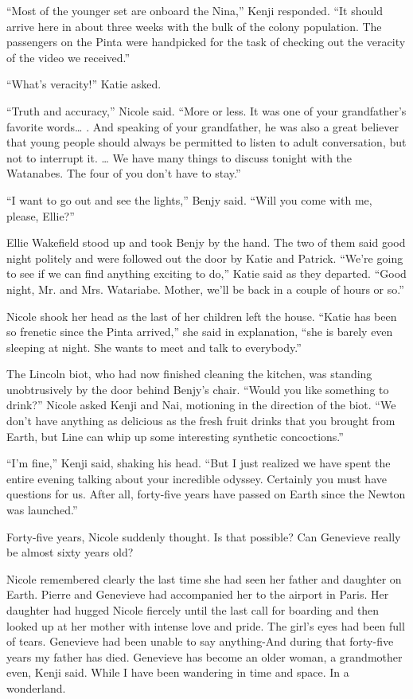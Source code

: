 \documentclass[]{article}
\begin{document}
{“Most of the younger set are onboard the Nina,” Kenji responded.  “It should arrive here in about three weeks with the bulk of the colony population.  The passengers on the Pinta were handpicked for the task of checking out the veracity of the video we received.”

“What’s veracity!” Katie asked.

“Truth and accuracy,” Nicole said.  “More or less.  It was one of your grandfather’s favorite words… .  And speaking of your grandfather, he was also a great believer that young people should always be permitted to listen to adult conversation, but not to interrupt it.  … We have many things to discuss tonight with the Watanabes.  The four of you don’t have to stay.”

“I want to go out and see the lights,” Benjy said.  “Will you come with me, please, Ellie?”

Ellie Wakefield stood up and took Benjy by the hand.  The two of them said good night politely and were followed out the door by Katie and Patrick.  “We’re going to see if we can find anything exciting to do,” Katie said as they departed.  “Good night, Mr.  and Mrs.  Watariabe.  Mother, we’ll be back in a couple of hours or so.”

Nicole shook her head as the last of her children left the house.  “Katie has been so frenetic since the Pinta arrived,” she said in explanation, “she is barely even sleeping at night.  She wants to meet and talk to everybody.”

The Lincoln biot, who had now finished cleaning the kitchen, was standing unobtrusively by the door behind Benjy’s chair.  “Would you like something to drink?” Nicole asked Kenji and Nai, motioning in the direction of the biot.  “We don’t have anything as delicious as the fresh fruit drinks that you brought from Earth, but Line can whip up some interesting synthetic concoctions.”

“I’m fine,” Kenji said, shaking his head.  “But I just realized we have spent the entire evening talking about your incredible odyssey.  Certainly you must have questions for us.  After all, forty-five years have passed on Earth since the Newton was launched.”

Forty-five years, Nicole suddenly thought.  Is that possible? Can Genevieve really be almost sixty years old?

Nicole remembered clearly the last time she had seen her father and daughter on Earth.  Pierre and Genevieve had accompanied her to the airport in Paris.  Her daughter had hugged Nicole fiercely until the last call for boarding and then looked up at her mother with intense love and pride.  The girl’s eyes had been full of tears.  Genevieve had been unable to say anything-And during that forty-five years my father has died.  Genevieve has become an older woman, a grandmother even, Kenji said.  While I have been wandering in time and space.  In a wonderland.

}
\end{document}
